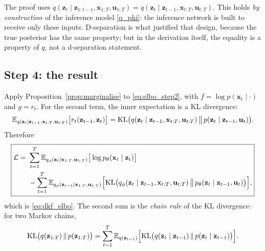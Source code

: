 \begin{story}
The proof uses $q(\mathbf{z}_t \mid \mathbf{z}_{1:t-1}, \mathbf{x}_{1:T},
\mathbf{u}_{1:T}) = q(\mathbf{z}_t \mid \mathbf{z}_{t-1},
\mathbf{x}_{t:T}, \mathbf{u}_{t:T})$. This holds \emph{by construction}
of the inference model \eqref{q_phi}: the inference network is built to
receive only these inputs. D-separation is what justified that design,
because the true posterior has the same property; but in the derivation
itself, the equality is a property of $q$, not a d-separation statement.
\end{story}

\subsection*{Step 4: the result}

Apply Proposition~\ref{prop:marginalise} to \eqref{eq:elbo_step2}, with
$f = \log p(\mathbf{x}_t \mid \cdot)$ and $g = r_t$. For the second
term, the inner expectation is a KL divergence:
\begin{equation*}
    \mathbb{E}_{q(\mathbf{z}_t \mid \mathbf{z}_{t-1}, \mathbf{x}_{t:T},
    \mathbf{u}_{t:T})}\big[r_t(\mathbf{z}_{t-1}, \mathbf{z}_t)\big] =
    \mathrm{KL}\big(q(\mathbf{z}_t \mid \mathbf{z}_{t-1}, \mathbf{x}_{t:T},
    \mathbf{u}_{t:T}) \,\big\|\, p(\mathbf{z}_t \mid \mathbf{z}_{t-1},
    \mathbf{u}_{t})\big).
\end{equation*}
Therefore
\begin{equation*}
\boxed{
\begin{aligned}
    \mathcal{L} =\ & \sum_{t=1}^T \mathbb{E}_{q_\phi(\mathbf{z}_{t} \mid
    \mathbf{x}_{1:T}, \mathbf{u}_{1:T})} \big[\log p_\theta(\mathbf{x}_t
    \mid \mathbf{z}_{t})\big] \\
    & - \sum_{t=1}^T \mathbb{E}_{q_\phi(\mathbf{z}_{t-1} \mid \mathbf{x}_{1:T},
    \mathbf{u}_{1:T})} \Big[ \mathrm{KL}\big(q_\phi(\mathbf{z}_t \mid
    \mathbf{z}_{t-1}, \mathbf{x}_{t:T}, \mathbf{u}_{t:T}) \,\big\|\,
    p_\theta(\mathbf{z}_t \mid \mathbf{z}_{t-1}, \mathbf{u}_{t})\big)
    \Big],
\end{aligned}
}
\end{equation*}
which is \eqref{eq:dkf_elbo}. The second sum is the \emph{chain rule}
of the KL divergence: for two Markov chains,
\begin{equation*}
    \mathrm{KL}\big(q(\mathbf{z}_{1:T}) \,\|\, p(\mathbf{z}_{1:T})\big) =
    \sum_{t=1}^T \mathbb{E}_{q(\mathbf{z}_{t-1})}\Big[\mathrm{KL}\big(q(\mathbf{z}_t
    \mid \mathbf{z}_{t-1}) \,\|\, p(\mathbf{z}_t \mid \mathbf{z}_{t-1})
    \big)\Big].
\end{equation*}

